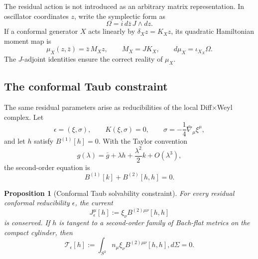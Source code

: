 \documentclass[11pt]{article}
\newtheorem{proposition}[theorem]{Proposition}
\theoremstyle{definition}
\theoremstyle{remark}
\begin{document}
The residual action is not introduced as an arbitrary matrix
representation.  In oscillator coordinates $z$, write the symplectic form
as
\begin{equation}\label{eq:symplectic-form}
 \Omega=i\,d\bar z\,J\wedge dz.
\end{equation}
If a conformal generator $X$ acts linearly by $\delta_Xz=K_Xz$, its
quadratic Hamiltonian moment map is
\begin{equation}\label{eq:moment-map}
 \mu_X(z,\bar z)=\bar z\,M_Xz,
 \qquad M_X=JK_X,
 \qquad d\mu_X=\iota_{X_X}\Omega.
\end{equation}
The $J$-adjoint identities ensure the correct reality of $\mu_X$.

\subsection{The conformal Taub constraint}

The same residual parameters arise as reducibilities of the local
Diff$\times$Weyl complex.  Let
\begin{equation}
 \epsilon=(\xi,\sigma),
 \qquad K(\xi,\sigma)=0,
 \qquad \sigma=-\frac14\bar\nabla_\mu\xi^\mu,
\end{equation}
and let $h$ satisfy $B^{(1)}[h]=0$.  With the Taylor convention
\begin{equation}
 g(\lambda)=\bar g+\lambda h+\frac{\lambda^2}{2}k+O(\lambda^3),
\end{equation}
the second-order equation is
\begin{equation}\label{eq:second-order-Bach}
 B^{(1)}[k]+B^{(2)}[h,h]=0.
\end{equation}

\begin{proposition}[Conformal Taub solvability constraint]
\label{prop:Taub-constraint}
For every residual conformal reducibility $\epsilon$, the current
\begin{equation}
 J_\epsilon^\mu[h]
 :=\xi_\nu B^{(2)\mu\nu}[h,h]
\end{equation}
is conserved.  If $h$ is tangent to a second-order family of Bach-flat
metrics on the compact cylinder, then
\begin{equation}\label{eq:Taub-charge}
 \boxed{
 \mathcal T_\epsilon[h]
 :=\int_{S^3}n_\mu\xi_\nu
 B^{(2)\mu\nu}[h,h],d\Sigma=0.}
\end{equation}
\end{proposition}
\end{document}
